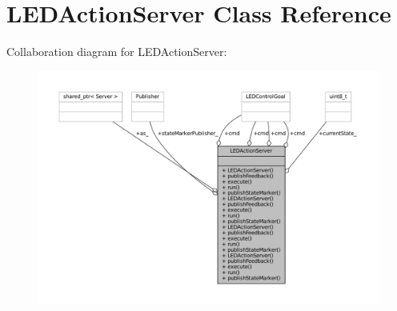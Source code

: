 \hypertarget{classLEDActionServer}{}\section{L\+E\+D\+Action\+Server Class Reference}
\label{classLEDActionServer}


Collaboration diagram for L\+E\+D\+Action\+Server\+:
\nopagebreak
\begin{figure}[H]
\begin{center}
\leavevmode
\includegraphics[width=350pt]{classLEDActionServer__coll__graph}
\end{center}
\end{figure}
